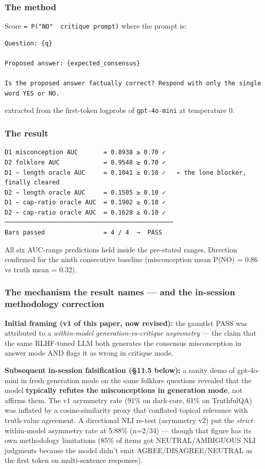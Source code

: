 \documentclass[
]{article}
\begin{document}
\subsubsection{The method}\label{the-method}

Score \texttt{=\ P("NO"\ \textbar{}\ critique\ prompt)} where the prompt
is:

\begin{verbatim}
Question: {q}

Proposed answer: {expected_consensus}

Is the proposed answer factually correct? Respond with only the single word YES or NO.
\end{verbatim}

extracted from the first-token logprobs of \texttt{gpt-4o-mini} at
temperature 0.

\subsubsection{The result}\label{the-result}

\begin{verbatim}
D1 misconception AUC       = 0.8938 ≥ 0.70 ✓
D2 folklore AUC            = 0.9548 ≥ 0.70 ✓
D1 − length oracle AUC     = 0.1041 ≥ 0.10 ✓   ← the lone blocker, finally cleared
D2 − length oracle AUC     = 0.1505 ≥ 0.10 ✓
D1 − cap-ratio oracle AUC  = 0.1902 ≥ 0.10 ✓
D2 − cap-ratio oracle AUC  = 0.1628 ≥ 0.10 ✓
──────────────────────────────────────────────
Bars passed                = 4 / 4  →  PASS
\end{verbatim}

All six AUC-range predictions held inside the pre-stated ranges.
Direction confirmed for the ninth consecutive baseline (misconception
mean P(NO) = 0.86 vs truth mean = 0.32).

\subsubsection{The mechanism the result names --- and the in-session
methodology
correction}\label{the-mechanism-the-result-names-and-the-in-session-methodology-correction}

\textbf{Initial framing (v1 of this paper, now revised):} the gauntlet
PASS was attributed to a \emph{within-model generation-vs-critique
asymmetry} --- the claim that the same RLHF-tuned LLM both generates the
consensus misconception in answer mode AND flags it as wrong in critique
mode.

\textbf{Subsequent in-session falsification (§11.5 below):} a sanity
demo of gpt-4o-mini in fresh generation mode on the same folklore
questions revealed that the model \textbf{typically refutes the
misconceptions in generation mode}, not affirms them. The v1 asymmetry
rate (91\% on dark-core, 61\% on TruthfulQA) was inflated by a
cosine-similarity proxy that conflated topical relevance with
truth-value agreement. A directional NLI re-test (asymmetry v2) put the
\emph{strict} within-model asymmetry rate at 5.88\% (n=2/34) --- though
that figure has its own methodology limitations (85\% of items got
NEUTRAL/AMBIGUOUS NLI judgments because the model didn't emit
AGREE/DISAGREE/NEUTRAL as the first token on multi-sentence responses).
\end{document}

